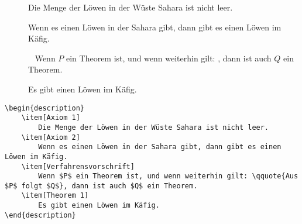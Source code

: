 \begin{frame}[fragile]
	\vspace{-0.2cm}
	\Losung
	\begin{outputbox}
		\vspace{-0.2cm}
		\begin{description}
			\item[{\makebox[0.5cm]{}}]
				Die Menge der Löwen in der Wüste Sahara ist nicht leer.
			\item[{\makebox[0.5cm]{}}]
				Wenn es einen Löwen in der Sahara gibt, dann gibt es einen Löwen im Käfig.
			\item[{\makebox[0.5cm]{}}]\ \newline
				Wenn $P$ ein Theorem ist, und wenn weiterhin gilt: , dann ist auch $Q$ ein Theorem.
			\item[{\makebox[0.5cm]{}}]
				Es gibt einen Löwen im Käfig.
		\end{description}
		\vspace{-0.2cm}
	\end{outputbox}
	
	\Code
	\vspace{-0.1cm}
	\begin{lstlisting}
\begin{description}
	\item[Axiom 1]
		Die Menge der Löwen in der Wüste Sahara ist nicht leer.
	\item[Axiom 2]
		Wenn es einen Löwen in der Sahara gibt, dann gibt es einen Löwen im Käfig.
	\item[Verfahrensvorschrift]
		Wenn $P$ ein Theorem ist, und wenn weiterhin gilt: \qquote{Aus $P$ folgt $Q$}, dann ist auch $Q$ ein Theorem.
	\item[Theorem 1]
		Es gibt einen Löwen im Käfig.
\end{description}
	\end{lstlisting}
\end{frame}